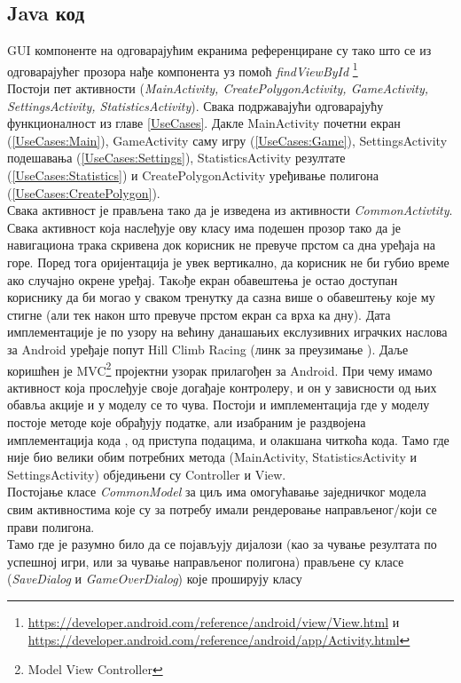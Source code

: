 \subsection{Java код}
GUI компоненте на одговарајућим екранима референциране су тако што се из одговарајућег прозора нађе компонента уз помоћ \emph{findViewById} \footnote{\url{https://developer.android.com/reference/android/view/View.html} и \url{https://developer.android.com/reference/android/app/Activity.html}}
\\ \indent 
Постоји пет активности (\emph{MainActivity, CreatePolygonActivity, GameActivity, SettingsActivity, StatisticsActivity}). Свака подржавајући одговарајућу функционалност из главе \ref{UseCases}. Дакле MainActivity почетни екран (\ref{UseCases:Main}), GameActivity  саму игру (\ref{UseCases:Game}), SettingsActivity подешавања (\ref{UseCases:Settings}), StatisticsActivity резултате (\ref{UseCases:Statistics}) и CreatePolygonActivity уређивање полигона (\ref{UseCases:CreatePolygon}).
\\ \indent 
Свака активност је прављена тако да је изведена из активности \emph{CommonActivtity}. Свака активност која наслеђује ову класу има подешен прозор тако да је навигациона трака скривена док корисник не превуче прстом са дна уређаја на горе. Поред тога оријентација је увек вертикално, да корисник не би губио време ако случајно окрене уређај. Такoђе екран обавештења је остао доступан кориснику да би могао у сваком тренутку да сазна више о обавештењу које му стигне (али тек након што превуче прстом екран са врха ка дну).
 Дата имплементације је по узору на већину данашањих екслузивних играчких наслова за Android уређаје попут Hill Climb Racing (линк за преузимање \cite{HillCR}). Даље коришћен је MVC\footnote{Model View Controller} пројектни узорак прилагођен за Android. При чему имамо активност која прослеђује своје догађаје контролеру, и он у зависности од њих обавља акције и у моделу се то чува. Постоји и имплементација где у моделу постоје методе које обрађују податке, али изабраним је раздвојена имплементација кода , од приступа подацима, и олакшана читкоћа кода.  Тамо где није био велики обим потребних метода (MainActivity, StatisticsActivity и SettingsActivity) обједињени су Controller и View. 
 \\ \indent
 Постојање класе \emph{CommonModel} за циљ има омогућавање заједничког модела свим активностима које су за потребу имали рендеровање направљеног/који се прави полигона. 
 \\ \indent
 Тамо где је разумно било да се појављују дијалози (као за чување резултата по успешној игри, или за чување направљеног полигона) прављене су класе (\emph{SaveDialog} и \emph{GameOverDialog}) које проширују класу 
